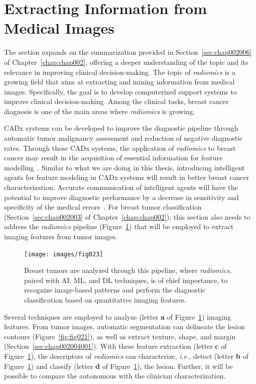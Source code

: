 \section{Extracting Information from Medical Images}
\label{sec:app001006}

The section expands on the summarization provided in Section~\ref{sec:chap002006} of Chapter~\ref{chap:chap002}, offering a deeper understanding of the topic and its relevance in improving clinical decision-making.
The topic of {\it radiomics} is a growing field that aims at extracting and mining information from medical images.
Specifically, the goal is to develop computerized support systems to improve clinical decision-making.
Among the clinical tasks, breast cancer diagnosis is one of the main areas where {\it radiomics} is growing.

\ac{CADx} systems can be developed to improve the diagnostic pipeline through automatic tumor malignancy assessment and reduction of negative diagnostic rates.
Through these \ac{CADx} systems, the application of {\it radiomics} to breast cancer may result in the acquisition of essential information for feature modelling~\cite{10.1007/978-3-030-59716-0_71}.
Similar to what we are doing in this thesis, introducing intelligent agents for feature modeling in \ac{CADx} systems will result in better breast cancer characterization.
Accurate communication of intelligent agents will have the potential to improve diagnostic performance by a decrease in sensitivity and specificity of the medical errors~\cite{doi:10.1148/radiol.2020192039}.
For breast tumor classification (Section~\ref{sec:chap002003} of Chapter~\ref{chap:chap002}), this section also needs to address the {\it radiomics} pipeline (Figure~\ref{fig:fig023}) that will be employed to extract imaging features from tumor images.

\begin{figure}[htbp]
\centering
\texttt{[image: images/fig023]}
\caption{Breast tumors are analyzed through this pipeline, where {\it radiomics}, paired with AI, ML, and DL techniques, is of chief importance, to recognize image-based patterns and perform the diagnostic classification based on quantitative imaging features.}
\label{fig:fig023}
\end{figure}

Several techniques are employed to analyze (letter {\bf a} of Figure~\ref{fig:fig023}) imaging features.
From tumor images, automatic segmentation can delineate the lesion contours (Figure~\ref{fig:fig021}), as well as extract texture, shape, and margin (Section~\ref{sec:chap002004001}).
With these feature extraction (letter {\bf c} of Figure~\ref{fig:fig023}), the descriptors of {\it radiomics} can characterize, {\it i.e.}, detect (letter {\bf b} of Figure~\ref{fig:fig023}) and classify (letter {\bf d} of Figure~\ref{fig:fig023}), the lesion.
Further, it will be possible to compare the autonomous with the clinician characterization.

